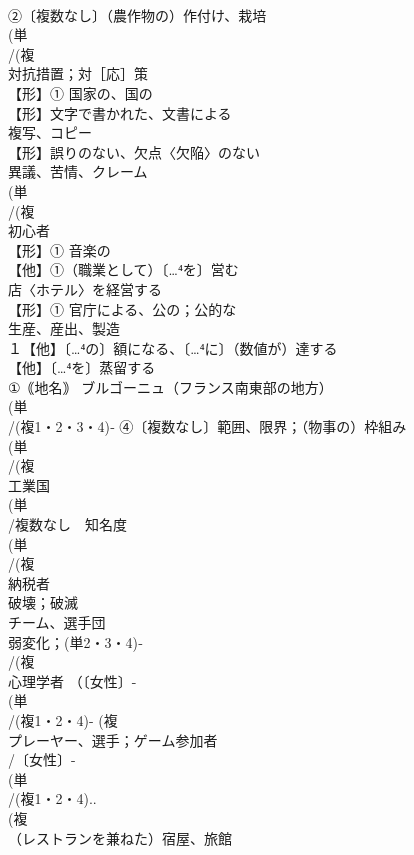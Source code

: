 \documentclass[8pt]{extreport}
\begin{document}
\begin{CJK}{UTF8}{min}
\\	②〔複数なし〕（農作物の）作付け、栽培
\\	(単
\\	/(複
\\	対抗措置；対［応］策
\\	【形】① 国家の、国の
\\	【形】文字で書かれた、文書による 
\\	複写、コピー 
\\	【形】誤りのない、欠点〈欠陥〉のない
\\	異議、苦情、クレーム
\\	(単
\\	/(複
\\	初心者
\\	【形】① 音楽の 
\\	【他】①（職業として）〔…⁴を〕営む 
\\	店〈ホテル〉を経営する
\\	【形】① 官庁による、公の；公的な 
\\	生産、産出、製造 
\\	１【他】〔…⁴の〕額になる、〔…⁴に〕（数値が）達する
\\	【他】〔…⁴を〕蒸留する
\\	①｟地名｠ ブルゴーニュ（フランス南東部の地方）
\\	(単
\\	/(複1・2・3・4)‐ ④〔複数なし〕範囲、限界；（物事の）枠組み
\\	(単
\\	/(複
\\	工業国
\\	(単
\\	/複数なし　知名度
\\	(単
\\	/(複
\\	納税者
\\	破壊；破滅
\\	チーム、選手団 
\\	弱変化；(単2・3・4)‐
\\	/(複
\\	心理学者 （〔女性〕-
\\	(単
\\	/(複1・2・4)- (複
\\	プレーヤー、選手；ゲーム参加者 
\\	/〔女性〕-
\\	(単
\\	/(複1・2・4)..
\\	(複
\\	（レストランを兼ねた）宿屋、旅館 

\end{CJK}
\end{document}
